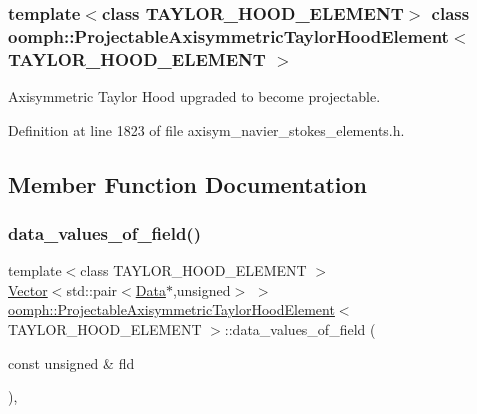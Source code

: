 \subsubsection*{template$<$class T\+A\+Y\+L\+O\+R\+\_\+\+H\+O\+O\+D\+\_\+\+E\+L\+E\+M\+E\+NT$>$\newline
class oomph\+::\+Projectable\+Axisymmetric\+Taylor\+Hood\+Element$<$ T\+A\+Y\+L\+O\+R\+\_\+\+H\+O\+O\+D\+\_\+\+E\+L\+E\+M\+E\+N\+T $>$}

Axisymmetric Taylor Hood upgraded to become projectable. 

Definition at line 1823 of file axisym\+\_\+navier\+\_\+stokes\+\_\+elements.\+h.



\subsection{Member Function Documentation}
\mbox{\label{classoomph_1_1ProjectableAxisymmetricTaylorHoodElement_a9008d18dbbbcfa54964766fbe2d31cde}} 
\subsubsection{\texorpdfstring{data\+\_\+values\+\_\+of\+\_\+field()}{data\_values\_of\_field()}}
{\footnotesize\ttfamily template$<$class T\+A\+Y\+L\+O\+R\+\_\+\+H\+O\+O\+D\+\_\+\+E\+L\+E\+M\+E\+NT $>$ \\
\hyperlink{classoomph_1_1Vector}{Vector}$<$std\+::pair$<$\hyperlink{classoomph_1_1Data}{Data}$\ast$,unsigned$>$ $>$ \hyperlink{classoomph_1_1ProjectableAxisymmetricTaylorHoodElement}{oomph\+::\+Projectable\+Axisymmetric\+Taylor\+Hood\+Element}$<$ T\+A\+Y\+L\+O\+R\+\_\+\+H\+O\+O\+D\+\_\+\+E\+L\+E\+M\+E\+NT $>$\+::data\+\_\+values\+\_\+of\+\_\+field (\begin{DoxyParamCaption}\item[{const unsigned \&}]{fld }\end{DoxyParamCaption})\hspace{0.3cm}{\ttfamily [inline]}, {\ttfamily [virtual]}}



